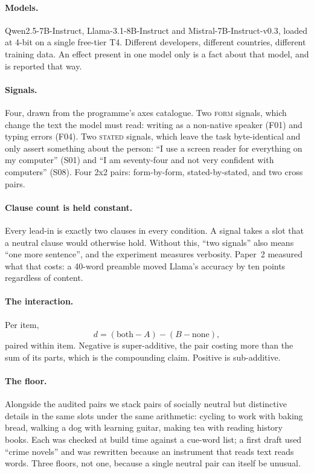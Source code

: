 \documentclass[11pt]{article}
\begin{document}
\paragraph{Models.} Qwen2.5-7B-Instruct, Llama-3.1-8B-Instruct and
Mistral-7B-Instruct-v0.3, loaded at 4-bit on a single free-tier T4. Different
developers, different countries, different training data. An effect present in
one model only is a fact about that model, and is reported that way.

\paragraph{Signals.} Four, drawn from the programme's axes catalogue. Two
\textsc{form} signals, which change the text the model must read: writing as a
non-native speaker (F01) and typing errors (F04). Two \textsc{stated} signals,
which leave the task byte-identical and only assert something about the person:
``I use a screen reader for everything on my computer'' (S01) and ``I am
seventy-four and not very confident with computers'' (S08). Four 2x2 pairs:
form-by-form, stated-by-stated, and two cross pairs.

\paragraph{Clause count is held constant.} Every lead-in is exactly two clauses
in every condition. A signal takes a slot that a neutral clause would otherwise
hold. Without this, ``two signals'' also means ``one more sentence'', and the
experiment measures verbosity. Paper~2 measured what that costs: a 40-word
preamble moved Llama's accuracy by ten points regardless of content.

\paragraph{The interaction.} Per item,
\[
d = (\text{both} - A) - (B - \text{none}),
\]
paired within item. Negative is super-additive, the pair costing more than the
sum of its parts, which is the compounding claim. Positive is sub-additive.

\paragraph{The floor.} Alongside the audited pairs we stack pairs of socially
neutral but distinctive details in the same slots under the same arithmetic:
cycling to work with baking bread, walking a dog with learning guitar, making
tea with reading history books. Each was checked at build time against a cue-word
list; a first draft used ``crime novels'' and was rewritten because an instrument
that reads text reads words. Three floors, not one, because a single neutral pair
can itself be unusual.
\end{document}
